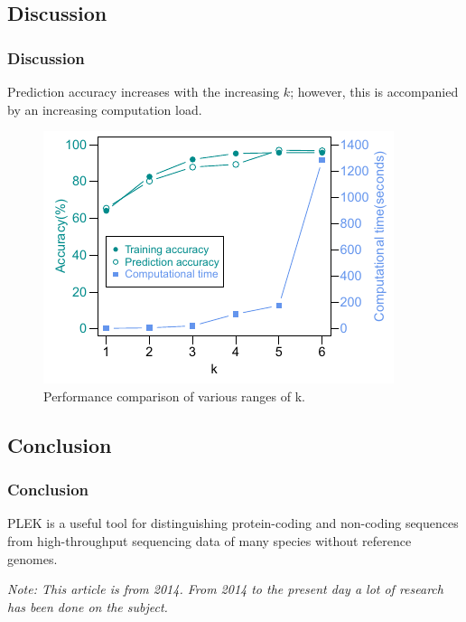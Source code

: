 \documentclass[hyperref={pdfpagelabels=false}]{beamer}
\begin{document}
\subsection{Discussion}
\begin{frame}
\frametitle{Discussion}
Prediction accuracy increases with the increasing $k$; however, this is accompanied by an increasing computation load. \pause

\begin{figure}
	\centering
	\includegraphics[scale=0.5]{fig6}
	\caption{Performance comparison of various ranges of k.}
	\label{fig:fig5}
\end{figure}
\end{frame}


\subsection{Conclusion}
\begin{frame}
\frametitle{Conclusion}
PLEK is a useful tool for distinguishing protein-coding and non-coding sequences from high-throughput sequencing data of many species without reference genomes. 

\begin{center}
 \textit{Note: This article is from 2014. From 2014 to the present day a lot of research has been done on the subject.}\pause
\end{center}

\end{frame}
\end{document}
